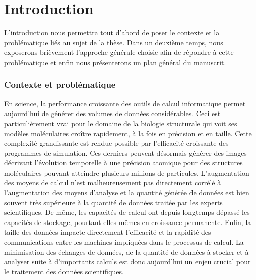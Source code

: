 
\chapter*{Introduction} %
\mtcaddchapter
{} %
\mtcaddpart
{}  %

L'introduction nous permettra tout d'abord de poser le contexte et la problématique liés au sujet de la thèse. Dans un deuxième temps, nous exposerons brièvement l'approche générale choisie afin de répondre à cette problématique et enfin nous présenterons un plan général du manuscrit.

\subsection*{Contexte et problématique}

En science, la performance croissante des outils de calcul informatique permet aujourd'hui de générer des volumes de données considérables. Ceci est particulièrement vrai pour le domaine de la biologie structurale qui voit ses modèles moléculaires croître rapidement, à la fois en précision et en taille. Cette complexité grandissante est rendue possible par l'efficacité croissante des programmes de simulation. Ces derniers peuvent désormais générer des images décrivant l'évolution temporelle à une précision atomique pour des structures moléculaires pouvant atteindre plusieurs millions de particules. L'augmentation des moyens de calcul n'est malheureusement pas directement corrélé à l'augmentation des moyens d'analyse et la quantité générée de données est bien souvent très supérieure à la quantité de données traitée par les experts scientifiques. De même, les capacités de calcul ont depuis longtemps dépassé les capacités de stockage, pourtant elles-mêmes en croissance permanente. Enfin, la taille des données impacte directement l'efficacité et la rapidité des communications entre les machines impliquées dans le processus de calcul. La minimisation des échanges de données, de la quantité de données à stocker et à analyser suite à d'importants calculs est donc aujourd'hui un enjeu crucial pour le traitement des données scientifiques.

